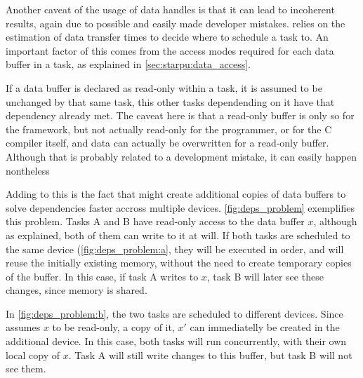 \documentclass[main.tex]{subfiles}
\begin{document}
Another caveat of the usage of data handles is that it can lead to incoherent results, again due to possible and easily made developer mistakes. \starpu relies on the estimation of data transfer times to decide where to schedule a task to. An important factor of this comes from the access modes required for each data buffer in a task, as explained in \cref{sec:starpu:data_access}.

If a data buffer is declared as read-only within a task, it is assumed to be unchanged by that same task, this other tasks dependending on it have that dependency already met.
The caveat here is that a read-only buffer is only so for the framework, but not actually read-only for the programmer, or for the C compiler itself, and data can actually be overwritten for a read-only buffer. Although that is probably related to a development mistake, it can easily happen nontheless

Adding to this is the fact that \starpu might create additional copies of data buffers to solve dependencies faster accross multiple devices. \cref{fig:deps_problem} exemplifies this problem. Tasks A and B have read-only access to the data buffer $x$, although as explained, both of them can write to it at will. If both tasks are scheduled to the same device (\cref{fig:deps_problem:a}, they will be executed in order, and \starpu will reuse the initially existing memory, without the need to create temporary copies of the buffer. In this case, if task A writes to $x$, task B will later see these changes, since memory is shared.


In \cref{fig:deps_problem:b}, the two tasks are scheduled to different devices. Since \starpu assumes $x$ to be read-only, a copy of it, $x'$ can immediatelly be created in the additional device. In this case, both tasks will run concurrently, with their own local copy of $x$. Task A will still write changes to this buffer, but task B will not see them.




\end{document}

